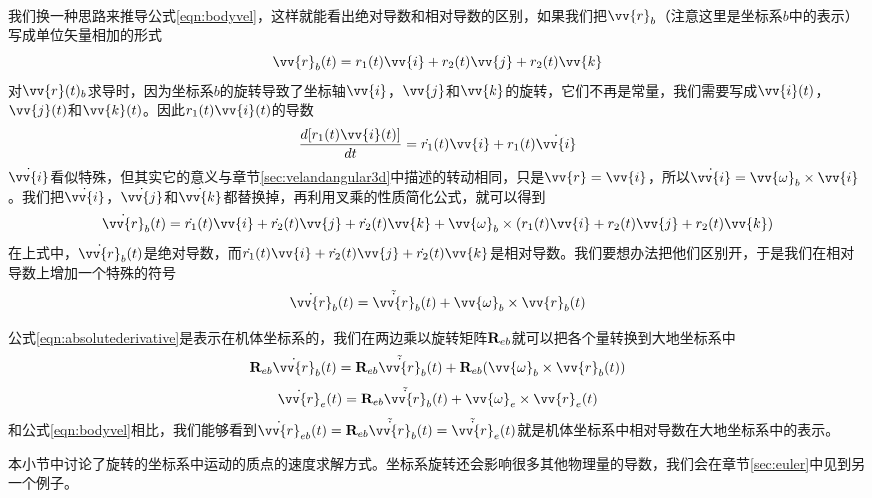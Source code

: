 \documentclass[11pt]{article}
\begin{document}

\ \\

我们换一种思路来推导公式\ref{eqn:bodyvel}，这样就能看出绝对导数和相对导数的区别，如果我们把$\vv{r}_b$（注意这里是坐标系$b$中的表示）写成单位矢量相加的形式
$$
\vv{r}_b(t) = r_1(t)\vv{i}+r_2(t)\vv{j}+r_2(t)\vv{k}
$$
对$\vv{r}(t)_b$求导时，因为坐标系$b$的旋转导致了坐标轴$\vv{i}$，$\vv{j}$和$\vv{k}$的旋转，它们不再是常量，我们需要写成$\vv{i}(t)$，$\vv{j}(t)$和$\vv{k}(t)$。因此$r_1(t)\vv{i}(t)$的导数
$$
\frac{d[r_1(t)\vv{i}(t)]}{dt} = \dot{r_1}(t)\vv{i} + r_1(t)\dot{\vv{i}}
$$
$\dot{\vv{i}}$看似特殊，但其实它的意义与章节\ref{sec:velandangular3d}中描述的转动相同，只是$\vv{r} = \vv{i}$，所以$\dot{\vv{i}} = \vv{\omega}_b \times \vv{i}$。我们把$\dot{\vv{i}}$，$\dot{\vv{j}}$和$\dot{\vv{k}}$都替换掉，再利用叉乘的性质简化公式，就可以得到
$$
\dot{\vv{r}}_b(t) = \dot{r_1}(t)\vv{i}+\dot{r_2}(t)\vv{j}+\dot{r_2}(t)\vv{k} + \vv{\omega}_b \times (r_1(t)\vv{i}+r_2(t)\vv{j}+r_2(t)\vv{k}) 
$$
在上式中，$\dot{\vv{r}}_b(t)$是绝对导数，而$\dot{r_1}(t)\vv{i}+\dot{r_2}(t)\vv{j}+\dot{r_2}(t)\vv{k}$是相对导数。我们要想办法把他们区别开，于是我们在相对导数上增加一个特殊的符号
\begin{equation}\label{eqn:absolutederivative}
\dot{\vv{r}}_b(t) = \tilde{\dot{\vv{r}}}_b(t) + \vv{\omega}_b \times  \vv{r}_b(t)
\end{equation}

公式\ref{eqn:absolutederivative}是表示在机体坐标系的，我们在两边乘以旋转矩阵${\bf R}_{eb}$就可以把各个量转换到大地坐标系中
$$
{\bf R}_{eb}\dot{\vv{r}}_b(t) = {\bf R}_{eb}\tilde{\dot{\vv{r}}}_b(t) + {\bf R}_{eb}(\vv{\omega}_b \times  \vv{r}_b(t))
$$
$$
\dot{\vv{r}}_e(t) = {\bf R}_{eb}\tilde{\dot{\vv{r}}}_b(t) + \vv{\omega}_e \times  \vv{r}_e(t)
$$
和公式\ref{eqn:bodyvel}相比，我们能够看到$\dot{\vv{r}}_{eb}(t) = {\bf R}_{eb}\tilde{\dot{\vv{r}}}_b(t) = \tilde{\dot{\vv{r}}}_e(t)$就是机体坐标系中相对导数在大地坐标系中的表示。

本小节中讨论了旋转的坐标系中运动的质点的速度求解方式。坐标系旋转还会影响很多其他物理量的导数，我们会在章节\ref{sec:euler}中见到另一个例子。
\ \\
\ \\
\end{document}
